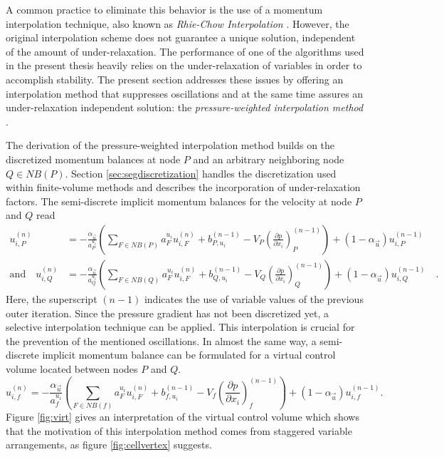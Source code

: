 A common practice to eliminate this behavior is the use of a momentum interpolation technique, also known as \emph{Rhie-Chow Interpolation} \cite{rhie82}. However, the original interpolation scheme does not guarantee a unique solution, independent of the amount of under-relaxation. The performance of one of the algorithms used in the present thesis heavily relies on the under-relaxation of variables in order to accomplish stability. The present section addresses these issues by offering an interpolation method that suppresses oscillations and at the same time assures an under-relaxation independent solution: the \emph{pressure-weighted interpolation method} \cite{choi99,choi03,majumdar88,miller88,zhang14}.

The derivation of the pressure-weighted interpolation method builds on the discretized momentum balances at node \(P\) and an arbitrary neighboring node \(Q \in NB(P)\). Section \ref{sec:segdiscretization} handles the discretization used within finite-volume methods and describes the incorporation of under-relaxation factors. The semi-discrete implicit momentum balances for the velocity at node \(P\) and \(Q\) read
\begin{align*}
    u_{i,P}^{(n)} 
    &= 
    - \frac{\alpha_{\vec{u}}}{a_P^{u_i}} \left(\sum_{F \in NB(P)} a_F^{u_i} u_{i,F}^{(n)}
    +                                     b_{P,u_i}^{(n-1)} 
    -                                     V_P\left(\frac{\partial p}{\partial x_i}\right)_P^{(n-1)} \right)
    + \left(1 - \alpha_{\vec{u}}\right) u_{i,P}^{(n-1)}  \\[1em]
    \text{and} \quad
    u_{i,Q}^{(n)} 
    &= 
    - \frac{\alpha_{\vec{u}}}{a_Q^{u_i}} \left(\sum_{F \in NB(Q)} a_F^{u_i} u_{i,F}^{(n)}
    +                                     b_{Q,u_i}^{(n-1)} 
    -                                     V_Q\left(\frac{\partial p}{\partial x_i}\right)_Q^{(n-1)}   \right)
    + \left(1 - \alpha_{\vec{u}}\right) u_{i,Q}^{(n-1)} \quad.
\end{align*}
Here, the superscript \((n-1)\) indicates the use of variable values of the previous outer iteration. Since the pressure gradient has not been discretized yet, a selective interpolation technique \cite{schaefer99} can be applied. This interpolation is crucial for the prevention of the mentioned oscillations. In almost the same way, a semi-discrete implicit momentum balance can be formulated for a virtual control volume located between nodes \(P\) and \(Q\). \begin{equation}
  \label{eq:virtualu}
  u_{i,f}^{(n)} 
  = 
  - \frac{\alpha_{\vec{u}}}{a_f^{u_i}} \left(\sum_{F \in NB(f)} a_F^{u_i} u_{i,F}^{(n)} 
  +                                     b_{f,u_i}^{(n-1)} 
  -                                     V_f\left(\frac{\partial p}{\partial x_i}\right)_f^{(n-1)}  \right)
  + \left(1 - \alpha_{\vec{u}}\right) u_{i,f}^{(n-1)}.
\end{equation}
Figure \ref{fig:virt} gives an interpretation of the virtual control volume which shows that the motivation of this interpolation method comes from staggered variable arrangements, as figure \ref{fig:cellvertex} suggests.

